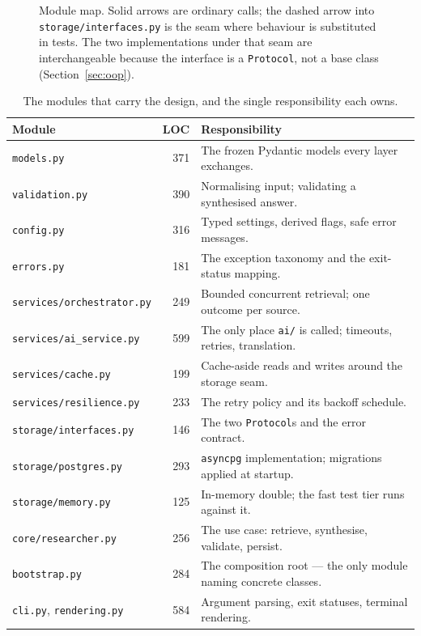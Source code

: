 \documentclass[10pt,a4paper]{article}
\begin{document}
\begin{figure}[htbp]
\caption{Module map. Solid arrows are ordinary calls; the dashed arrow into
\texttt{storage/interfaces.py} is the seam where behaviour is substituted in tests. The two
implementations under that seam are interchangeable because the interface is a \texttt{Protocol},
not a base class (Section~\ref{sec:oop}).}
\label{fig:modules}
\end{figure}

\begin{table}[htbp]
\centering
\footnotesize
\caption{The modules that carry the design, and the single responsibility each owns.}
\label{tab:modules}
\begin{tabularx}{\textwidth}{@{}lrX@{}}
\toprule
\textbf{Module} & \textbf{LOC} & \textbf{Responsibility} \\
\midrule
\texttt{models.py} & 371 & The frozen Pydantic models every layer exchanges. \\
\texttt{validation.py} & 390 & Normalising input; validating a synthesised answer. \\
\texttt{config.py} & 316 & Typed settings, derived flags, safe error messages. \\
\texttt{errors.py} & 181 & The exception taxonomy and the exit-status mapping. \\
\texttt{services/orchestrator.py} & 249 & Bounded concurrent retrieval; one outcome per source. \\
\texttt{services/ai\_service.py} & 599 & The only place \texttt{ai/} is called; timeouts, retries, translation. \\
\texttt{services/cache.py} & 199 & Cache-aside reads and writes around the storage seam. \\
\texttt{services/resilience.py} & 233 & The retry policy and its backoff schedule. \\
\texttt{storage/interfaces.py} & 146 & The two \texttt{Protocol}s and the error contract. \\
\texttt{storage/postgres.py} & 293 & \texttt{asyncpg} implementation; migrations applied at startup. \\
\texttt{storage/memory.py} & 125 & In-memory double; the fast test tier runs against it. \\
\texttt{core/researcher.py} & 256 & The use case: retrieve, synthesise, validate, persist. \\
\texttt{bootstrap.py} & 284 & The composition root --- the only module naming concrete classes. \\
\texttt{cli.py}, \texttt{rendering.py} & 584 & Argument parsing, exit statuses, terminal rendering. \\
\bottomrule
\end{tabularx}
\end{table}
\end{document}
